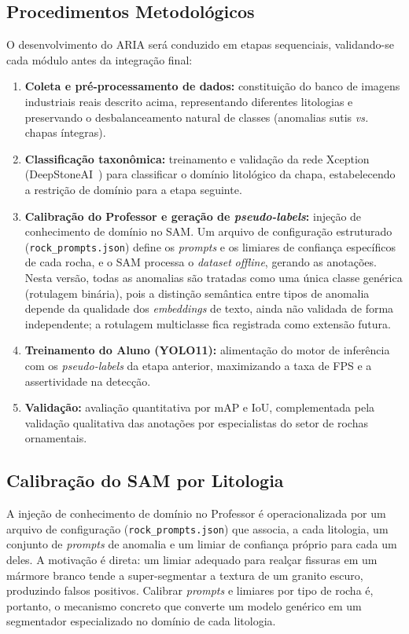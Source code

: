 \documentclass[12pt]{article}
\begin{document}
\subsection{Procedimentos Metodológicos}

O desenvolvimento do ARIA será conduzido em etapas sequenciais, validando-se cada módulo antes da integração final:

\begin{enumerate}
  \item \textbf{Coleta e pré-processamento de dados:} constituição do banco de imagens industriais reais descrito acima, representando diferentes litologias e preservando o desbalanceamento natural de classes (anomalias sutis \textit{vs.} chapas íntegras).
  \item \textbf{Classificação taxonômica:} treinamento e validação da rede Xception (DeepStoneAI~\cite{deepstoneai_moreira2025}) para classificar o domínio litológico da chapa, estabelecendo a restrição de domínio para a etapa seguinte.
  \item \textbf{Calibração do Professor e geração de \textit{pseudo-labels}:} injeção de conhecimento de domínio no SAM. Um arquivo de configuração estruturado (\texttt{rock\_prompts.json}) define os \textit{prompts} e os limiares de confiança específicos de cada rocha, e o SAM processa o \textit{dataset} \textit{offline}, gerando as anotações. Nesta versão, todas as anomalias são tratadas como uma única classe genérica (rotulagem binária), pois a distinção semântica entre tipos de anomalia depende da qualidade dos \textit{embeddings} de texto, ainda não validada de forma independente; a rotulagem multiclasse fica registrada como extensão futura.
  \item \textbf{Treinamento do Aluno (YOLO11):} alimentação do motor de inferência com os \textit{pseudo-labels} da etapa anterior, maximizando a taxa de FPS e a assertividade na detecção.
  \item \textbf{Validação:} avaliação quantitativa por mAP e IoU, complementada pela validação qualitativa das anotações por especialistas do setor de rochas ornamentais.
\end{enumerate}

\subsection{Calibração do SAM por Litologia}

A injeção de conhecimento de domínio no Professor é operacionalizada por um arquivo de configuração (\texttt{rock\_prompts.json}) que associa, a cada litologia, um conjunto de \textit{prompts} de anomalia e um limiar de confiança próprio para cada um deles. A motivação é direta: um limiar adequado para realçar fissuras em um mármore branco tende a super-segmentar a textura de um granito escuro, produzindo falsos positivos. Calibrar \textit{prompts} e limiares por tipo de rocha é, portanto, o mecanismo concreto que converte um modelo genérico em um segmentador especializado no domínio de cada litologia.
\end{document}
